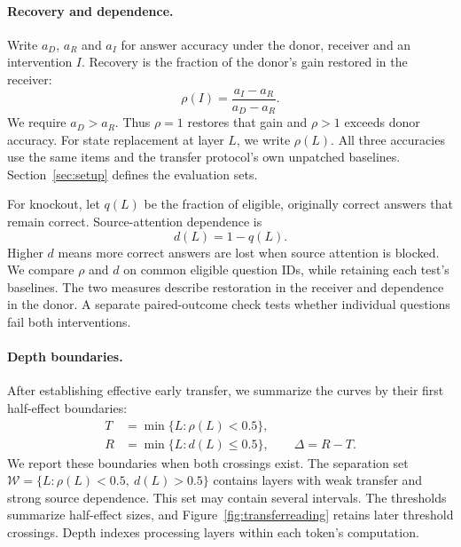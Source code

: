 \paragraph{Recovery and dependence.}
Write $a_D$, $a_R$ and $a_I$ for answer accuracy under the donor, receiver
and an intervention $I$. Recovery is the fraction of the donor's gain
restored in the receiver:
\begin{equation}
\rho(I)=\frac{a_I-a_R}{a_D-a_R}.
\label{eq:rho}
\end{equation}
We require $a_D>a_R$. Thus $\rho=1$ restores that gain and $\rho>1$ exceeds donor accuracy.
For state replacement at layer $L$, we write $\rho(L)$. All three
accuracies use the same items and the transfer protocol's own unpatched
baselines. Section~\ref{sec:setup} defines the evaluation sets.

For knockout, let $q(L)$ be the fraction of eligible, originally correct
answers that remain correct. Source-attention dependence is
\begin{equation}
d(L)=1-q(L).
\label{eq:dependence}
\end{equation}
Higher $d$ means more correct answers are lost when source attention is
blocked. We compare $\rho$ and $d$ on common eligible question IDs, while
retaining each test's baselines. The two measures describe restoration in
the receiver and dependence in the donor. A separate paired-outcome check tests
whether individual questions fail both interventions.

\paragraph{Depth boundaries.}
After establishing effective early transfer, we summarize the curves by
their first half-effect boundaries:
\begin{equation}
\begin{aligned}
T&=\min\{L:\rho(L)<0.5\},\\
R&=\min\{L:d(L)\le0.5\},\qquad \Delta=R-T.
\end{aligned}
\label{eq:boundaries}
\end{equation}
We report these boundaries when both crossings exist.
The separation set $\mathcal W=\{L:\rho(L)<0.5,\ d(L)>0.5\}$ contains
layers with weak transfer and strong source dependence. This set may
contain several intervals. The thresholds summarize half-effect sizes,
and Figure~\ref{fig:transferreading} retains later threshold crossings.
Depth indexes processing layers within each token's computation.

